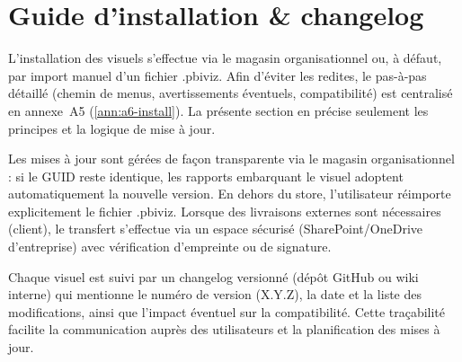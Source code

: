 \section{Guide d’installation \& changelog}
\label{sec:install-changelog}

L’installation des visuels s’effectue via le magasin organisationnel ou, à défaut, par import manuel d’un fichier .pbiviz. Afin d’éviter les redites, le pas-à-pas détaillé (chemin de menus, avertissements éventuels, compatibilité) est centralisé en annexe~A5 (\autoref{ann:a6-install}). La présente section en précise seulement les principes et la logique de mise à jour.

Les mises à jour sont gérées de façon transparente via le magasin organisationnel : si le GUID reste identique, les rapports embarquant le visuel adoptent automatiquement la nouvelle version. En dehors du store, l’utilisateur réimporte explicitement le fichier .pbiviz. Lorsque des livraisons externes sont nécessaires (client), le transfert s’effectue via un espace sécurisé (SharePoint/OneDrive d’entreprise) avec vérification d’empreinte ou de signature.

Chaque visuel est suivi par un changelog versionné (dépôt GitHub ou wiki interne) qui mentionne le numéro de version (X.Y.Z), la date et la liste des modifications, ainsi que l’impact éventuel sur la compatibilité. Cette traçabilité facilite la communication auprès des utilisateurs et la planification des mises à jour.
